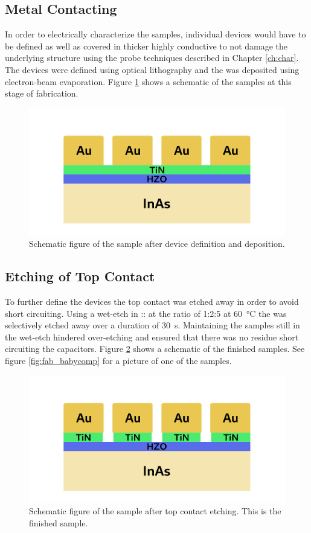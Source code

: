 \documentclass[11pt,twoside]{eitExjobb}
\begin{document}
\subsection{Metal Contacting}
In order to electrically characterize the samples, individual devices would
have to be defined as well as covered in thicker highly conductive  to
not damage the underlying structure using the probe techniques described in
Chapter \ref{ch:char}. The devices were defined using optical lithography and
the  was deposited using electron-beam evaporation. Figure
\ref{fig:fab_4} shows a schematic of the samples at this stage of fabrication.

\begin{figure}[htbp]
    \centering
    \includegraphics[width=.45\linewidth]{fig/fabproc/fab_4.png}
    \caption{Schematic figure of the sample after device definition and 
    deposition.}\label{fig:fab_4}
\end{figure}

\subsection{Etching of Top Contact}
To further define the devices the  top contact was etched away in order
to avoid short circuiting. Using a wet-etch in :: at
the ratio of 1:2:5 at \SI{60}{\celsius} the  was selectively etched
away over a duration of \SI{30}{\second}. Maintaining the samples still in the
wet-etch hindered over-etching and ensured that there was no residue 
short circuiting the capacitors. Figure \ref{fig:fab_5} shows a schematic of
the finished samples. See figure \ref{fig:fab_babycomp} for a picture of one of
the samples.

\begin{figure}[htbp]
    \centering
    \includegraphics[width=.45\linewidth]{fig/fabproc/fab_5.png}
    \caption{Schematic figure of the sample after top contact etching. This is
    the finished sample.}\label{fig:fab_5}
\end{figure}
\end{document}
